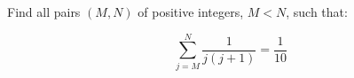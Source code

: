 Find all pairs $(M, N)$ of positive integers, $M < N$, such that:

$$ \sum_{j = M}^N \frac{1}{ j (j + 1) } = \frac{1}{10} $$
